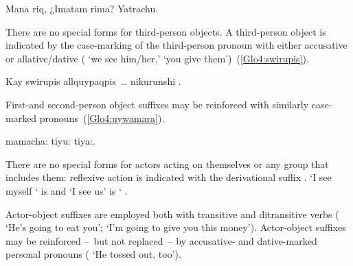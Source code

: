 %
{Mana riq, ¿Imatam rima? Yatrachu.}%
{}%
{}{}%

\noindent
There are no special forms for third-person objects. A third-person object is indicated by the case-marking of the third-person pronoun  with either accusative  or allative/dative  (  ‘we see him/her,’   ‘you give them’)~(\ref{Glo4:swirupis}).

%
{Kay swirupis allquypaqpis~\dots{} nikurunshi .}%
{}%
{}{}%

\noindent
First-and second-person object suffixes may be reinforced with similarly case-marked pronouns~(\ref{Glo4:uywamara}).

%
{  mamacha: tiyu: tiya:.}%
{}%
{}{}%

There are no special forms for actors acting on themselves or any group that includes them: reflexive action is indicated with the derivational suffix . ‘I see myself ‘ is   and ‘I see us’ is ‘  .

Actor-object suffixes are employed both with transitive and ditransitive verbs ( ‘He’s going to eat you’;  ‘I’m going to give you this money’). Actor-object suffixes may be reinforced --~but not replaced~-- by accusative- and dative-marked personal pronouns (  ‘He tossed  out, too’).

